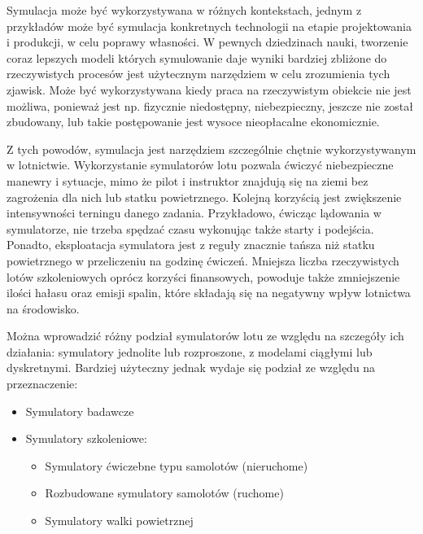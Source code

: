 Symulacja może być wykorzystywana w różnych kontekstach, jednym z przykładów może być symulacja konkretnych technologii na etapie projektowania i produkcji, w celu poprawy własności. W pewnych dziedzinach nauki, tworzenie coraz lepszych modeli których symulowanie daje wyniki bardziej zbliżone do rzeczywistych procesów jest użytecznym narzędziem w celu zrozumienia tych zjawisk. Może być wykorzystywana kiedy praca na rzeczywistym obiekcie nie jest możliwa, ponieważ jest np. fizycznie niedostępny, niebezpieczny, jeszcze nie został zbudowany, lub takie postępowanie jest wysoce nieopłacalne ekonomicznie.

Z tych powodów, symulacja jest narzędziem szczególnie chętnie wykorzystywanym w lotnictwie\cite{neal2020}. Wykorzystanie symulatorów lotu pozwala ćwiczyć niebezpieczne manewry i sytuacje, mimo że pilot i instruktor znajdują się na ziemi bez zagrożenia dla nich lub statku powietrznego. Kolejną korzyścią jest zwiększenie intensywności terningu danego zadania. Przykładowo, ćwicząc lądowania w symulatorze, nie trzeba spędzać czasu wykonując także starty i podejścia. Ponadto, eksploatacja symulatora jest z reguły znacznie tańsza niż statku powietrznego w przeliczeniu na godzinę ćwiczeń. Mniejsza liczba rzeczywistych lotów szkoleniowych oprócz korzyści finansowych, powoduje także zmniejszenie ilości hałasu oraz emisji spalin, które składają się na negatywny wpływ lotnictwa na środowisko\cite{eaer2019}.

Można wprowadzić różny podział symulatorów lotu ze względu na szczegóły ich działania: symulatory jednolite lub rozproszone, z modelami ciągłymi lub dyskretnymi. Bardziej użyteczny jednak wydaje się podział ze względu na przeznaczenie\cite{szczepanski1990}:
\begin{itemize}
  \item Symulatory badawcze
  \item Symulatory szkoleniowe:
  \begin{itemize}
    \item Symulatory ćwiczebne typu samolotów (nieruchome)
    \item Rozbudowane symulatory samolotów (ruchome)
    \item Symulatory walki powietrznej
  \end{itemize}
\end{itemize}

